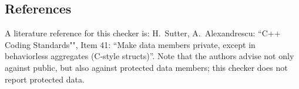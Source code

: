 \subsection{References}

A literature reference for this checker is: H.~Sutter, A.~Alexandrescu: ``C++
Coding Standards"", Item 41: ``Make data members private, except in
behaviorless aggregates (C-style structs)''. Note that the authors advise
not only against public, but also against protected data members; this checker
does not report protected data.
